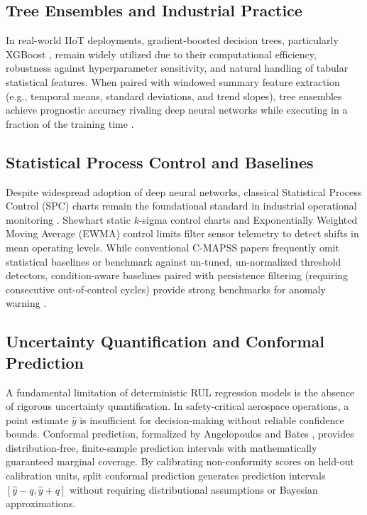\subsection{Tree Ensembles and Industrial Practice}
In real-world IIoT deployments, gradient-boosted decision trees, particularly XGBoost \cite{chen2016xgboost}, remain widely utilized due to their computational efficiency, robustness against hyperparameter sensitivity, and natural handling of tabular statistical features. When paired with windowed summary feature extraction (e.g., temporal means, standard deviations, and trend slopes), tree ensembles achieve prognostic accuracy rivaling deep neural networks while executing in a fraction of the training time \cite{chen2016xgboost}.

\subsection{Statistical Process Control and Baselines}
Despite widespread adoption of deep neural networks, classical Statistical Process Control (SPC) charts remain the foundational standard in industrial operational monitoring \cite{montgomery2009introduction}. Shewhart static $k$-sigma control charts and Exponentially Weighted Moving Average (EWMA) control limits filter sensor telemetry to detect shifts in mean operating levels. While conventional C-MAPSS papers frequently omit statistical baselines or benchmark against un-tuned, un-normalized threshold detectors, condition-aware baselines paired with persistence filtering (requiring consecutive out-of-control cycles) provide strong benchmarks for anomaly warning \cite{montgomery2009introduction}.

\subsection{Uncertainty Quantification and Conformal Prediction}
A fundamental limitation of deterministic RUL regression models is the absence of rigorous uncertainty quantification. In safety-critical aerospace operations, a point estimate $\hat{y}$ is insufficient for decision-making without reliable confidence bounds. Conformal prediction, formalized by Angelopoulos and Bates \cite{angelopoulos2021gentle}, provides distribution-free, finite-sample prediction intervals with mathematically guaranteed marginal coverage. By calibrating non-conformity scores on held-out calibration units, split conformal prediction generates prediction intervals $[\hat{y} - q, \hat{y} + q]$ without requiring distributional assumptions or Bayesian approximations.

